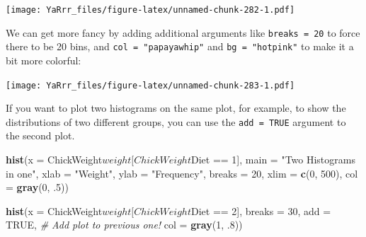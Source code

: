 \documentclass[]{book}
\newenvironment{Shaded}{\begin{snugshade}}{\end{snugshade}}
\newcommand{\KeywordTok}[1]{\textcolor[rgb]{0.13,0.29,0.53}{\textbf{{#1}}}}
\newcommand{\DataTypeTok}[1]{\textcolor[rgb]{0.13,0.29,0.53}{{#1}}}
\newcommand{\DecValTok}[1]{\textcolor[rgb]{0.00,0.00,0.81}{{#1}}}
\newcommand{\StringTok}[1]{\textcolor[rgb]{0.31,0.60,0.02}{{#1}}}
\newcommand{\CommentTok}[1]{\textcolor[rgb]{0.56,0.35,0.01}{\textit{{#1}}}}
\newcommand{\OtherTok}[1]{\textcolor[rgb]{0.56,0.35,0.01}{{#1}}}
\newcommand{\NormalTok}[1]{{#1}}
\theoremstyle{definition}
\theoremstyle{definition}
\theoremstyle{remark}
\begin{document}
\texttt{[image: YaRrr\_files/figure-latex/unnamed-chunk-282-1.pdf]}

We can get more fancy by adding additional arguments like
\texttt{breaks\ =\ 20} to force there to be 20 bins, and
\texttt{col\ =\ "papayawhip"} and \texttt{bg\ =\ "hotpink"} to make it a
bit more colorful:

\begin{Shaded}
\end{Shaded}

\texttt{[image: YaRrr\_files/figure-latex/unnamed-chunk-283-1.pdf]}

If you want to plot two histograms on the same plot, for example, to
show the distributions of two different groups, you can use the
\texttt{add = TRUE} argument to the second plot.

\begin{Shaded}
\begin{Highlighting}[]
\KeywordTok{hist}\NormalTok{(}\DataTypeTok{x =} \NormalTok{ChickWeight$weight[ChickWeight$Diet ==}\StringTok{ }\DecValTok{1}\NormalTok{],}
     \DataTypeTok{main =} \StringTok{"Two Histograms in one"}\NormalTok{,}
     \DataTypeTok{xlab =} \StringTok{"Weight"}\NormalTok{,}
     \DataTypeTok{ylab =} \StringTok{"Frequency"}\NormalTok{,}
     \DataTypeTok{breaks =} \DecValTok{20}\NormalTok{,}
     \DataTypeTok{xlim =} \KeywordTok{c}\NormalTok{(}\DecValTok{0}\NormalTok{, }\DecValTok{500}\NormalTok{),}
     \DataTypeTok{col =} \KeywordTok{gray}\NormalTok{(}\DecValTok{0}\NormalTok{, .}\DecValTok{5}\NormalTok{))}

\KeywordTok{hist}\NormalTok{(}\DataTypeTok{x =} \NormalTok{ChickWeight$weight[ChickWeight$Diet ==}\StringTok{ }\DecValTok{2}\NormalTok{],}
     \DataTypeTok{breaks =} \DecValTok{30}\NormalTok{,}
     \DataTypeTok{add =} \OtherTok{TRUE}\NormalTok{, }\CommentTok{# Add plot to previous one!}
     \DataTypeTok{col =} \KeywordTok{gray}\NormalTok{(}\DecValTok{1}\NormalTok{, .}\DecValTok{8}\NormalTok{))}
\end{Highlighting}
\end{Shaded}
\end{document}
